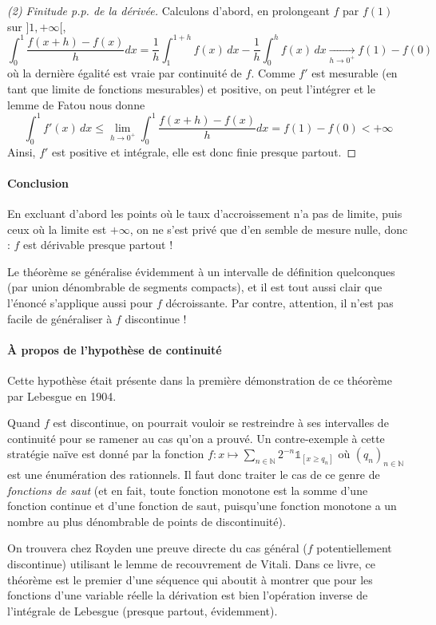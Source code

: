 \documentclass[a4paper, 11pt]{article}
\def\N{\mathbb{N}}
\def\Indic{\mathbb{1}}
\begin{document}
\begin{proof}[(2) Finitude p.p. de la dérivée]
Calculons d'abord, en prolongeant $f$ par $f(1)$ sur $]1,+\infty[$,
\[
  \int_0^1 \frac{f(x+h) - f(x)}{h}dx =
    \frac{1}{h} \int_1^{1+h} f(x)\,dx - \frac{1}{h} \int_0^h f(x)\,dx
    \underset{h \to 0^+}{\longrightarrow} f(1) - f(0)
\]
où la dernière égalité est vraie par continuité de $f$. Comme $f'$ est mesurable
(en tant que limite de fonctions mesurables) et positive, on peut l'intégrer et
le lemme de Fatou nous donne
\[ \int_0^{1} f'(x)\,dx \leq \lim_{h \to 0^+}
  \int_0^{1} \frac{f(x+h) - f(x)}{h}dx =
  f(1)- f(0) < +\infty \]
Ainsi, $f'$ est positive et intégrale, elle est donc finie presque partout.
\end{proof}

\paragraph{Conclusion} En excluant d'abord les points où le taux d'accroissement
n'a pas de limite, puis ceux où la limite est $+\infty$, on ne s'est privé que
d'en semble de mesure nulle, donc : $f$ est dérivable presque partout !

Le théorème se généralise évidemment à un intervalle de définition quelconques
(par union dénombrable de segments compacts), et il est tout aussi clair que
l'énoncé s'applique aussi pour $f$ décroissante. Par contre, attention, il n'est
pas facile de généraliser à $f$ discontinue !

\paragraph{À propos de l'hypothèse de continuité} Cette hypothèse était présente
dans la première démonstration de ce théorème par Lebesgue en 1904.

Quand $f$ est discontinue, on pourrait vouloir se restreindre à ses intervalles
de continuité pour se ramener au cas qu'on a prouvé. Un contre-exemple à cette
stratégie naïve est donné par la fonction $f : x \mapsto \sum_{n \in \N} 2^{-n}
\Indic_{[x \geq q_n]}$ où $(q_n)_{n \in \N}$ est une énumération des rationnels.
Il faut donc traiter le cas de ce genre de \emph{fonctions de saut} (et en fait,
toute fonction monotone est la somme d'une fonction continue et d'une fonction
de saut, puisqu'une fonction monotone a un nombre au plus dénombrable de points
de discontinuité).

On trouvera chez Royden une preuve directe du cas général ($f$ potentiellement
discontinue) utilisant le lemme de recouvrement de Vitali. Dans ce livre, ce
théorème est le premier d'une séquence qui aboutit à montrer que pour les
fonctions d'une variable réelle la dérivation est bien l'opération inverse de
l'intégrale de Lebesgue (presque partout, évidemment).
\end{document}
